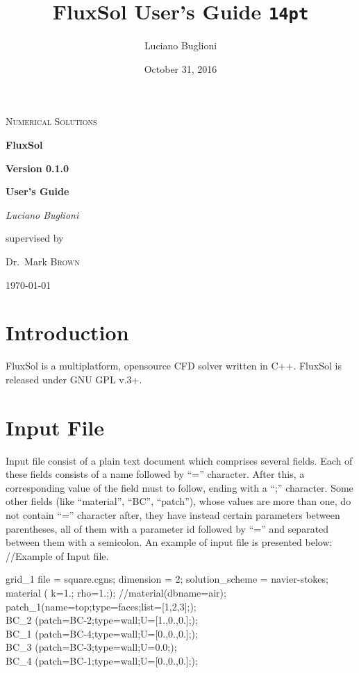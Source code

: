 \documentclass{article}     %
\title{FluxSol User's Guide \texttt{14pt}}
\date{October 31, 2016}
\author{Luciano Buglioni}
\begin{document}

\begin{titlepage}
	\centering
	{\scshape\LARGE Numerical Solutions\par}
	\vspace{1.5cm}
	{\Huge\bfseries FluxSol\par}
	\vspace{0.5cm}
	{\huge\bfseries Version 0.1.0\par}
	\vspace{2cm}	
	{\Large\bfseries User's Guide\par}
	\vspace{3cm}
	{\Large\itshape Luciano Buglioni\par}
	\vfill
	supervised by\par
	Dr.~Mark \textsc{Brown}

	\vfill

	{\large \today\par}
\end{titlepage}

\pagebreak


\tableofcontents
\pagebreak

\pagebreak
\section{Introduction}

FluxSol is a multiplatform, opensource CFD solver written in C++.
FluxSol is released under GNU GPL v.3+.
\section{Input File}

Input file consist of a plain text document which comprises several fields. Each of these fields consists of a name followed by  “=” character. After this, a corresponding value of the field must to follow, ending with a “;” character. Some other fields (like “material”, “BC”, “patch”), whose values are more than one, do not contain “=” character after, they have instead certain parameters between parentheses, all of them with a parameter id followed by “=” and separated between them with a semicolon. An example of input file is presented below: \\

//Example of Input file.

grid\_1 {
	file = square.cgns;
	dimension = 2;
	solution\_scheme = navier-stokes;
	material 	(
				k=1.;
				rho=1.;);
	//material(dbname=air);	
	patch\_1(name=top;type=faces;list=[1,2,3];);	\\	
	BC\_2 (patch=BC-2;type=wall;U=[1.,0.,0.];);\\
	BC\_1 (patch=BC-4;type=wall;U=[0.,0.,0.];); \\
	BC\_3 (patch=BC-3;type=wall;U=0.0;); \\
	BC\_4 (patch=BC-1;type=wall;U=[0.,0.,0.];);\\	
}
\end{document}
